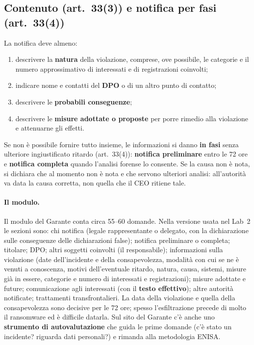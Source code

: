 \subsection{Contenuto (art.~33(3)) e notifica per fasi (art.~33(4))}
La notifica deve almeno:
\begin{enumerate}[label=(\alph*)]
  \item descrivere la \textbf{natura} della violazione, comprese, ove possibile, le categorie e il numero
    approssimativo di interessati e di registrazioni coinvolti;
  \item indicare nome e contatti del \textbf{DPO} o di un altro punto di contatto;
  \item descrivere le \textbf{probabili conseguenze};
  \item descrivere le \textbf{misure adottate o proposte} per porre rimedio alla violazione e attenuarne
    gli effetti.
\end{enumerate}
Se non è possibile fornire tutto insieme, le informazioni si danno \textbf{in fasi} senza ulteriore
ingiustificato ritardo (art.~33(4)): \textbf{notifica preliminare} entro le 72 ore e \textbf{notifica
completa} quando l'analisi forense lo consente. Se la causa non è nota, si dichiara che al momento non è
nota e che servono ulteriori analisi: all'autorità va data la causa corretta, non quella che il CEO
ritiene tale.

\paragraph{Il modulo.} Il modulo del Garante conta circa 55--60 domande. Nella versione usata nel Lab~2
le sezioni sono: chi notifica (legale rappresentante o delegato, con la dichiarazione sulle conseguenze
delle dichiarazioni false); notifica preliminare o completa; titolare; DPO; altri soggetti coinvolti
(il responsabile); informazioni sulla violazione (date dell'incidente e della consapevolezza, modalità
con cui se ne è venuti a conoscenza, motivi dell'eventuale ritardo, natura, causa, sistemi, misure già in
essere, categorie e numero di interessati e registrazioni); misure adottate e future; comunicazione agli
interessati (con il \textbf{testo effettivo}); altre autorità notificate; trattamenti transfrontalieri.
La data della violazione e quella della consapevolezza sono decisive per le 72 ore; spesso
l'esfiltrazione precede di molto il ransomware ed è difficile datarla. Sul sito del Garante c'è anche uno
\textbf{strumento di autovalutazione} che guida le prime domande (c'è stato un incidente? riguarda dati
personali?) e rimanda alla metodologia ENISA.

